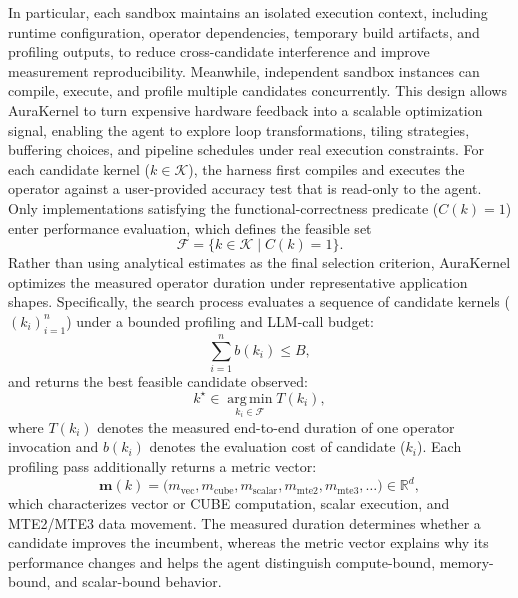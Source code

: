 In particular, each sandbox maintains an isolated execution context, including runtime configuration, operator dependencies, temporary build artifacts, and profiling outputs, to reduce cross-candidate interference and improve measurement reproducibility. Meanwhile, independent sandbox instances can compile, execute, and profile multiple candidates concurrently. This design allows AuraKernel to turn expensive hardware feedback into a scalable optimization signal, enabling the agent to explore loop transformations, tiling strategies, buffering choices, and pipeline schedules under real execution constraints.
For each candidate kernel ($k\in\mathcal{K}$), the harness first compiles and executes the operator against a user-provided accuracy test that is read-only to the agent. Only implementations satisfying the functional-correctness predicate ($C(k)=1$) enter performance evaluation, which defines the feasible set
\begin{equation}
\mathcal{F} = \{k \in \mathcal{K} \mid C(k) = 1\}.
\end{equation}
Rather than using analytical estimates as the final selection criterion, AuraKernel optimizes the measured operator duration under representative application shapes. Specifically, the search process evaluates a sequence of candidate kernels ($(k_i)_{i=1}^{n}$) under a bounded profiling and LLM-call budget:
\begin{equation}
\sum_{i=1}^{n} b(k_i)\le B,
\end{equation}
and returns the best feasible candidate observed:
\begin{equation}
k^{\star}\in\operatorname*{arg\,min}_{k_i\in\mathcal{F}} T(k_i),
\end{equation}
where $T(k_i)$ denotes the measured end-to-end duration of one operator invocation and $b(k_i)$ denotes the evaluation cost of candidate ($k_i$). Each profiling pass additionally returns a metric vector:
\begin{equation}
\mathbf{m}(k)=
\big(m_{\mathrm{vec}},m_{\mathrm{cube}},m_{\mathrm{scalar}},
m_{\mathrm{mte2}},m_{\mathrm{mte3}},\dots\big)\in\mathbb{R}^{d},
\end{equation}
which characterizes vector or CUBE computation, scalar execution, and MTE2/MTE3 data movement. The measured duration determines whether a candidate improves the incumbent, whereas the metric vector explains why its performance changes and helps the agent distinguish compute-bound, memory-bound, and scalar-bound behavior.

